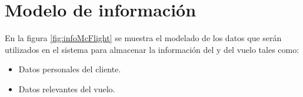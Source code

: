 %

\section{Modelo de información}

En la figura \ref{fig:infoMcFlight} se muestra el modelado de los datos que serán utilizados en el sistema para almacenar la información del  y del vuelo tales como:
\begin{itemize}
	\item Datos personales del cliente.
	\item Datos relevantes del vuelo.
\end{itemize}



